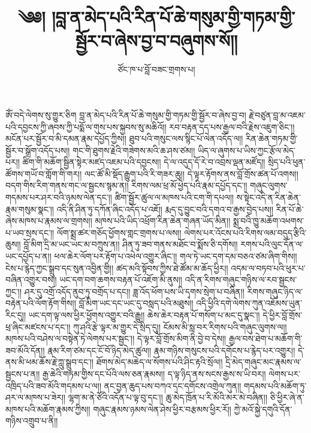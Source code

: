 \documentclass{article}
\title{༄༅། །བླ་ན་མེད་པའི་རིན་པོ་ཆེ་གསུམ་གྱི་གཏམ་གྱི་སྦྱོར་བ་ཞེས་བྱ་བ་བཞུགས་སོ།།}
\author{ཙོང་ཁ་པ་བློ་བཟང་གྲགས་པ།}
\date{}
\begin{document}
\maketitle

ཨོཾ་བདེ་ལེགས་སུ་གྱུར་ཅིག
བླ་ན་མེད་པའི་རིན་པོ་ཆེ་གསུམ་གྱི་གཏམ་གྱི་སྦྱོར་བ་ཞེས་བྱ་བ།
རྗེ་བཙུན་བླ་མ་འཇམ་པའི་དབྱངས་ཀྱི་ཞབས་ཀྱི་པདྨོ་ལ་གུས་པས་སྐྱབས་སུ་མཆིའོ།།
རབ་བརྟན་དད་པས་རྒྱལ་བའི་རྗེས་འཇུག་ཅིང༌།།
མངོན་པར་སྦྱོར་བ་མི་དམན་རྣམ་དཔྱོད་ཀྱིས།།
ཐུབ་པའི་གསུང་ལས་སྙིང་པོ་ལེན་འདོད་ལ།།
རིན་ཆེན་གཏམ་གྱི་སྦྱོར་བ་སྒྲོག་འདོད་པས།།
གང་གི་ཐུགས་རྗེའི་གཟེགས་མའི་ཆ་ཤས་ཙམ།།
ཡིད་ལ་ཞུགས་པ་ཡིས་ཀྱང་རྩོལ་མེད་པར།།
ཚིག་གི་མཆོག་སྦྱིན་སྟེར་མཛད་འཇམ་པའི་དབྱངས།།
དེ་ལ་འདུད་དོ་རེ་བ་འབྲས་ལྡན་མཛོད།།
སྲིད་པའི་ཕུན་ཚོགས་གཡོ་བ་གློག་གི་གར།།
ལང་ཚོ་མི་སྡོད་རྒྱུག་པའི་རི་གཟར་ཆུ།།
དེ་ལྟར་རྟོགས་ནས་བློ་གྲོས་ཚན་པོ་འགས།།
བདག་གིས་རིག་གནས་གང་ལ་སྦྱངས་སྙམ་ན།།
རིགས་ལམ་ཕྲ་མོ་ཕྱེད་པའི་རྣམ་དཔྱོད་དང༌།།
གཞུང་ལུགས་གདམས་པར་ཤར་བའི་ཉམས་ལེན་དང༌།།
ཚིག་སྦྱོར་ཚུལ་ལ་མཁས་པའི་ངག་གི་དཔལ།།
ས་སྟེང་འདི་ན་རིན་ཆེན་རྣམ་གསུམ་སྣང༌།།
འདི་ནི་ཤིན་ཏུ་དཀོན་ཞིང་འདོད་པ་འཇོ།།
རྨད་དུ་བྱུང་བའི་དགའ་བ་རྒྱས་བྱེད་པས།།
རིན་པོ་ཆེ་ཞེས་མཁས་པ་རྣམས་ལ་གྲགས།།
མཁས་པའི་ཡིད་འཕྲོག་རིན་ཆེན་གཞན་ཡོད་མིན།།
སྨྲ་བའི་ཁྱུ་མཆོག་འཕགས་པ་ཡབ་སྲས་དང༌།།
ལོག་སྨྲ་ཚར་གཅོད་ཕྱོགས་གླང་གྲགས་པ་ལས།།
ལེགས་པར་འོངས་པའི་རིགས་ལམ་བདུད་རྩིའི་ཆུས།།
བློ་མིག་དྲི་མ་ཡང་ཡང་མ་བཀྲུས་ན།།
ཤིན་ཏུ་ཟབ་གནས་མཐོང་བ་སྨོས་ཅི་དགོས།།
རགས་པའི་ལུང་དོན་ལ་ཡང་དཔྱོད་པ་ན།།
ཕལ་ཆེར་ལོག་པར་རྟོག་པ་འཕེལ་འགྱུར་ཞིང༌།།
གལ་ཏེ་ཡང་དག་དམ་བཅའ་ཙམ་ཞིག་གིས།།
ངེས་པ་རྙེད་ཀྱང་སྒྲུབ་དང་སུན་འབྱིན་གྱི།།
ཚད་མའི་སྟོབས་ཀྱིས་ཐེ་ཚོམ་མ་ཆོད་ཕྱིར།།
འདམ་ལ་བཏབ་པའི་ཕུར་པ་བཞིན་འགྱུར་བས།།
ཡང་དག་བག་ཆགས་བརྟན་པོ་འཇོག་མི་ནུས།།
འདི་ན་རིགས་གཞུང་གཉིས་ལ་རབ་སྦྱངས་ཀྱང༌།།
ཤར་དུ་འགྲོ་འདོད་ནུབ་ཏུ་བགྲོད་པ་དང།།
ཟླ་འོད་ཕོག་པས་ཡི་དྭགས་སྲེག་པ་བཞིན།།
རིགས་གཞུང་ཉིད་ལ་བརྟེན་པའི་ལོག་རྟོག་གིས།།
བློ་མིག་ཡང་དང་ཡང་དུ་བསླད་པའི་མཐུས།།
འདི་ཕྱིའི་དགེ་ལེགས་ཀུན་འཇོམས་ཡུན་རིང་དུ།།
ཡང་དག་ལྟ་ལས་ཕྱིར་ཕྱོགས་འགྱུར་བའི་རྒྱུ།།
ཆེས་ཆེར་བརྟན་པོ་གསོག་པ་མང་དུ་སྣང༌།།
དེ་ཕྱིར་བློ་གྲོས་ཕྲ་ཞིང་མཛངས་པ་དང༌།།
ཀུ་ཤའི་རྩེ་ལྟར་མ་གྱུར་དེ་སྲིད་དུ།།
ངོམས་མི་སླ་བར་རིགས་པའི་གཞུང་ལུགས་ལ།།
མཁས་པའི་བཤེས་ལ་བསྟེན་ཏེ་ལེགས་པར་སྦྱང༌།།
དེ་ལྟར་བློ་གྲོས་མིག་ནི་བྱེ་བ་དེས།།
རྒྱལ་བས་ཐེག་པ་མཆོག་གི་ཟབ་མོའི་དོན།།
རྣམ་རིག་ཙམ་དང་ངོ་བོ་ཉིད་མེད་ཚུལ།།
རྣམ་གཉིས་གསུངས་པའི་དགོངས་པ་རྙེད་པར་འགྱུར།།
དེ་ནས་མི་ཕམ་ཆོས་རྗེ་ཀླུ་སྒྲུབ་དང༌།།
ཐོགས་མེད་མཆེད་ལ་སོགས་པའི་ཤིང་རྟའི་སྲོལ།།
དྲི་མེད་གཞུང་མང་རྣམས་ལ་སྦྱངས་པ་ན།།
རྒྱ་ཆེའི་གཏམ་གྱིས་དང་པོའི་ལས་ཅན་རྣམས།།
ད་ལྟ་ཉིད་ནས་སངས་རྒྱས་ས་ཡི་བར།།
ལེགས་པར་འཁྲིད་པའི་ཟབ་མོའི་གདམས་པ་ལ།།
ནང་བྱན་ཆུད་པས་བཀའ་དང་དགོངས་འགྲེལ་ཀུན།།
གདམས་པའི་མཆོག་ཏུ་ཤར་ལ་མཁས་པ་ཟེར།།
ལྷག་མ་ནེ་ཙོའི་འདོན་པ་ལྟ་བུ་དང༌།།
ཆུ་མེད་ཁྲོན་པ་རི་མོའི་མར་མེ་བཞིན།།
ཅི་ཕྱིར་ཞེ་ན་མཁས་པའི་མཆོག་རྣམས་ཀྱིས།།
གཞུང་རྣམས་ཉམས་ལེན་ཤེས་ཕྱིར་བརྩམས་ཕྱིར་རོ།།
ཀྱེ་མའོ་སྐྱེ་དགུའི་དོན་གཉིས་འགྲུབ་པ་ནི།།
\end{document}
